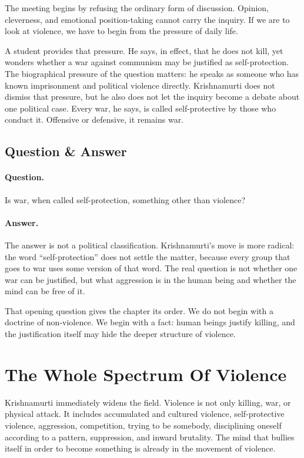 \documentclass[11pt,oneside]{book}
\begin{document}
The meeting begins by refusing the ordinary form of discussion. Opinion, cleverness, and emotional position-taking cannot carry the inquiry. If we are to look at violence, we have to begin from the pressure of daily life.

A student provides that pressure. He says, in effect, that he does not kill, yet wonders whether a war against communism may be justified as self-protection. The biographical pressure of the question matters: he speaks as someone who has known imprisonment and political violence directly. Krishnamurti does not dismiss that pressure, but he also does not let the inquiry become a debate about one political case. Every war, he says, is called self-protective by those who conduct it. Offensive or defensive, it remains war.

\subsection{Question \& Answer}

\paragraph{Question.}
Is war, when called self-protection, something other than violence?

\paragraph{Answer.}
The answer is not a political classification. Krishnamurti's move is more radical: the word ``self-protection'' does not settle the matter, because every group that goes to war uses some version of that word. The real question is not whether one war can be justified, but what aggression is in the human being and whether the mind can be free of it.

That opening question gives the chapter its order. We do not begin with a doctrine of non-violence. We begin with a fact: human beings justify killing, and the justification itself may hide the deeper structure of violence.

\section{The Whole Spectrum Of Violence}

Krishnamurti immediately widens the field. Violence is not only killing, war, or physical attack. It includes accumulated and cultured violence, self-protective violence, aggression, competition, trying to be somebody, disciplining oneself according to a pattern, suppression, and inward brutality. The mind that bullies itself in order to become something is already in the movement of violence.
\end{document}
